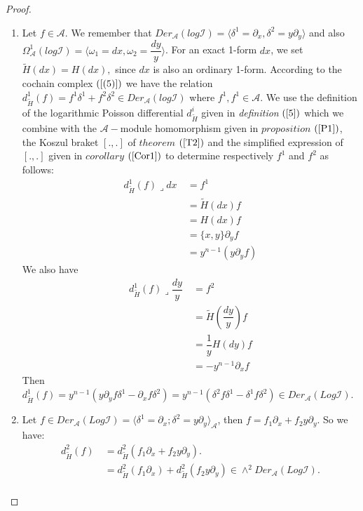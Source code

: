 \documentclass[a4paper, 12pt,oneside,reqno]{amsart}
\theoremstyle{definition}
\begin{document}
\begin{proof}
 \begin{enumerate}
 \item[1.]   
 Let $f\in \mathcal{A}$.  We remember that $Der_{\mathcal{A}}(log \mathcal{I}) = \langle \delta^{1} = \partial_{x}, \delta^{2} = y\partial_{y} \rangle$ and also $\Omega^{1}_{\mathcal{A}}(log \mathcal{I}) = \langle\omega_{1}=dx, \omega_{2}=\dfrac{dy}{y} \rangle$.
For an exact 1-form $dx$, we set $\tilde{H}(dx) = H(dx),$ since $dx$ is also an ordinary 1-form.
 According to the cochain complex $(\ref{(5)})$ we have the relation $d_{\tilde{H}}^{1}(f) = f^{1} \delta^{1} + f^{2}\delta^{2} \in Der_{\mathcal{A}}(log \mathcal{I})$ where $f^{1},f^{1}\in \mathcal{A}$.  We use 
the definition of the logarithmic Poisson differential $d^{i}_{\tilde{H}}$ given in \textit{definition} $(\ref{5})$ which we combine with the $\mathcal{A}-$module homomorphism given in $proposition$ $(\ref{P1})$, the Koszul braket $[.,.]$ of $theorem$ $(\ref{T2})$ and the simplified expression of $[.,.]$ given in $corollary$ $ (\ref{Cor1}) $ to determine respectively $f^{1}$ and $f^{2}$ as follows:
   \begin{align*}
   d_{\tilde{H}}^{1}(f)\lrcorner dx &\ = f^{1}\\
      &\ = \tilde{H}(dx)f\\
   &\ = H(dx)f\\
   &\ = \{x,y\}\partial_{y}f\\
  &\ = y^{n-1}(y\partial_{y}f)
   \end{align*}
 We also have
   \begin{align*}
   d_{\tilde{H}}^{1}(f)\lrcorner\dfrac{dy}{y} &\ = f^{2}\\
   &\ = \tilde{H}(\dfrac{dy}{y})f\\
   &\ =\dfrac{1}{y}H(dy)f\\
  &\ = -y^{n-1}\partial_{x}f
   \end{align*}
 Then
 $d_{\tilde{H}}^{1}(f) = y^{n-1}(y\partial_{y}f \delta^{1} -\partial_{x}f \delta^{2})= y^{n-1}(\delta^{2}f \delta^{1} -\delta^{1}f \delta^{2})\in Der_{\mathcal{A} }(Log \mathcal{I})$.
 \item[2.] Let $f \in Der_{\mathcal{A} }(Log \mathcal{I}) = \langle \delta^{1} = \partial_{x} ; \delta^{2} = y\partial_{y} \rangle_{\mathcal{A} }$, then $ f = f_{1}\partial_{x} + f_{2}y\partial_{y}$. So we have: 
 \begin{align*}
 d_{\tilde{H}}^{2}(f) &\ = d_{\tilde{H}}^{2}(f_{1}\partial_{x} + f_{2}y\partial_{y}).\\
 &\ = d_{\tilde{H}}^{2}(f_{1}\partial_{x}) + d_{\tilde{H}}^{2}(f_{2}y\partial_{y})\in \wedge^{2}Der_{\mathcal{A} }(Log \mathcal{I}).  \\

\end{align*}
\end{enumerate}
\end{proof}
\end{document}
